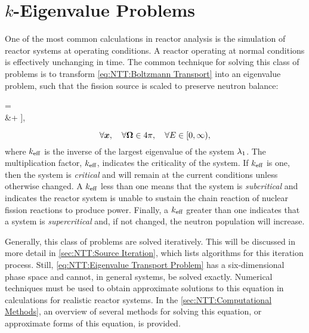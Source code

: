 {  \section{\texorpdfstring{$k$}{k}-Eigenvalue Problems}{\label{sec:NTT:k-Eigenvalue Problems}
    One of the most common calculations in reactor analysis is the simulation of reactor systems at operating conditions.
    A reactor operating at normal conditions is effectively unchanging in time.
    The common technique for solving this class of problems is to transform \cref{eq:NTT:Boltzmann Transport} into an eigenvalue problem, such that the fission source is scaled to preserve neutron balance:
    \begin{aequation}\label{eq:NTT:Eigenvalue Transport Problem}
      \Big[\dir\vdot\grad &+ \xst\Big]\aflux
        =
        \rfourpi\Bigg[
          \source\\
          &+ \intl[0][\infty]\intl[\fourpi]\xss\aflux[\loc][\dirprime][\Eprime]\ddirprime\dif{\Eprime}\\\qquad\qquad
          &+ \frac{\spect}{\keff}\intl[0][\infty]\nufis\sflux[\loc][\Eprime]\dif{\Eprime}
        \Bigg],
    \end{aequation}
    \begin{equation*}
      \forall\boldsymbol{x}, \quad \forall\boldsymbol{\Omega}\in4\pi,\quad \forall E\in[0,\infty),
    \end{equation*}
    where $k_{\text{eff}}$ is the inverse of the largest eigenvalue of the system $\lambda_1$.
    The multiplication factor, $k_{\text{eff}}$, indicates the criticality of the system.
    If $k_{\text{eff}}$ is one, then the system is \emph{critical} and will remain at the current conditions unless otherwise changed.
    A $k_{\text{eff}}$ less than one means that the system is \emph{subcritical} and indicates the reactor system is unable to sustain the chain reaction of nuclear fission reactions to produce power.
    Finally, a $k_{\text{eff}}$ greater than one indicates that a system is \emph{supercritical} and, if not changed, the neutron population will increase.

    Generally, this class of problems are solved iteratively.
    This will be discussed in more detail in \cref{sec:NTT:Source Iteration}, which lists algorithms for this iteration process.
    Still, \cref{eq:NTT:Eigenvalue Transport Problem} has a six-dimensional phase space and cannot, in general systems, be solved exactly.
    Numerical techniques must be used to obtain approximate solutions to this equation in calculations for realistic reactor systems.
    In the \cref{sec:NTT:Computational Methods}, an overview of several methods for solving this equation, or approximate forms of this equation, is provided.
  }

}
